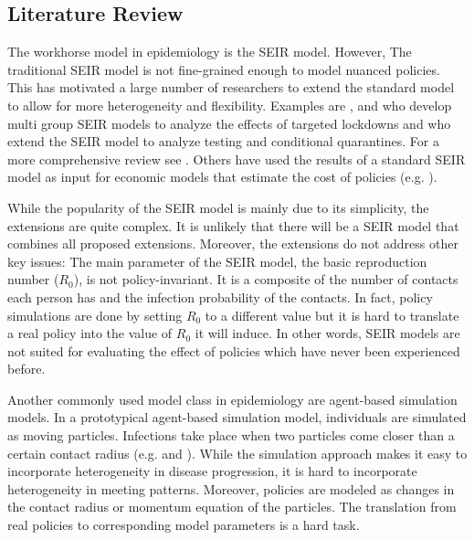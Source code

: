 \subsection{Literature Review}
\label{sec:literature_review}

The workhorse model in epidemiology is the SEIR model. However, The traditional SEIR
model is not fine-grained enough to model nuanced policies. This has motivated a
large number of researchers to extend the standard model to allow for more heterogeneity
and flexibility. Examples are \citet{Grimm2020}, \citet{Donsimoni2020} and
\citet{Acemoglu2020} who develop multi group SEIR models to analyze the effects of targeted
lockdowns and \citet{Berger2020} who extend the SEIR model to analyze testing and
conditional quarantines. For a more comprehensive review see \citet{Avery2020}. Others
have used the results of a standard SEIR model as input for economic models that
estimate the cost of policies (e.g. \citet{Dorn2020}).

While the popularity of the SEIR model is mainly due to its simplicity, the extensions
are quite complex. It is unlikely that there will be a SEIR model that combines all
proposed extensions. Moreover, the extensions do not address other key issues: The main
parameter of the SEIR model, the basic reproduction number ($R_0$), is not
policy-invariant. It is a composite of the number of contacts each person has and the
infection probability of the contacts. In fact, policy simulations are done by setting
$R_0$ to a different value but it is hard to translate a real policy into the value of
$R_0$ it will induce. In other words, SEIR models are not suited for evaluating the
effect of policies which have never been experienced before.

Another commonly used model class in epidemiology are agent-based simulation
models. In a prototypical agent-based simulation model, individuals are
simulated as moving particles. Infections take place when two particles come closer than
a certain contact radius (e.g. \citet{Silva2020} and \citet{Cuevas2020}). While the
simulation approach makes it easy to incorporate heterogeneity in disease progression, it
is hard to incorporate heterogeneity in meeting patterns. Moreover, policies are modeled
as changes in the contact radius or momentum equation of the particles. The translation
from real policies to corresponding model parameters is a hard task.


